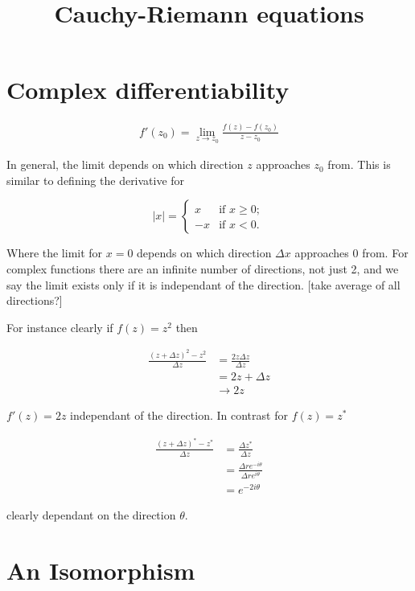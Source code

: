 \documentclass{article}
\title{Cauchy-Riemann equations}
\date{}
\begin{document}
\maketitle

\section{Complex differentiability}

\begin{align}
f'(z_0) = \lim_{z \rightarrow z_0} \frac{f(z) - f(z_0)}{z - z_0}
\end{align}

In general, the limit depends on which direction $z$ approaches $z_0$ from. This is similar to defining the derivative for

\[ |x| = \left\{ \begin{array}{ll}
         x & \mbox{if $x \geq 0$};\\
        -x & \mbox{if $x < 0$}.\end{array} \right. \]


Where the limit for $x=0$ depends on which direction $\Delta x$ approaches 0 from. For complex functions there are an infinite number of directions, not just 2, and we say the limit exists only if it is independant of the direction. [take average of all directions?]

For instance clearly if $f(z) = z^2$ then

\begin{align}
\frac{(z+\Delta z)^2 - z^2}{\Delta z} &= \frac{2z\Delta z}{\Delta z} \\
&= 2z + \Delta z \\
&\rightarrow 2z
\end{align}

$f'(z) = 2z$ independant of the direction. In contrast for $f(z) = z^*$

\begin{align}
\frac{(z+\Delta z)^* - z^*}{\Delta z} &= \frac{\Delta z^*}{\Delta z} \\
&= \frac{\Delta r e^{-i\theta}}{\Delta r e^{i\theta}} \\
&= e^{-2i\theta}
\end{align}

clearly dependant on the direction $\theta$.

\section{An Isomorphism}
\end{document}
